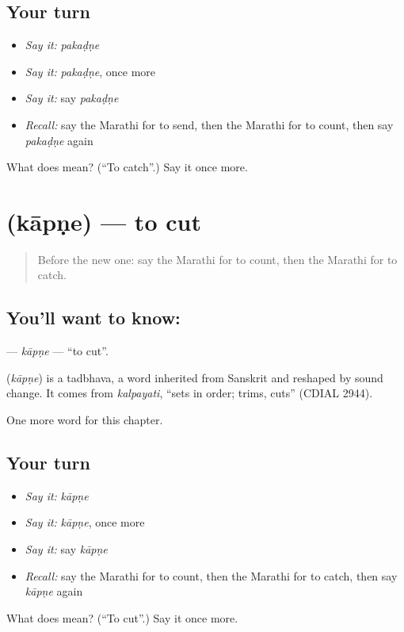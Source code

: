 \subsection*{Your turn}
\begin{itemize}
\raggedright
  \item \emph{Say it:} \emph{pakaḍṇe}
  \item \emph{Say it:} \emph{pakaḍṇe}, once more
  \item \emph{Say it:} say \emph{pakaḍṇe}
  \item \emph{Recall:} say the Marathi for to send, then the Marathi for to count, then say \emph{pakaḍṇe} again
\end{itemize}

\begin{tcolorbox}[breakable,colback=teal!4,colframe=teal!35!black,title={Before you move on}]
What does  mean? (\textquotedblleft{}To catch\textquotedblright{}.) Say it once more.
\end{tcolorbox}
\section[\texorpdfstring{\mr{कापणे} (kāpṇe)}{कापणे (kāpṇe)}]{ (kāpṇe) — to cut}

\label{lesson:MR-C80-kapne}



\begin{quote}
Before the new one: say the Marathi for to count, then the Marathi for to catch.
\end{quote}

\subsection*{You'll want to know: }
\textbf{} — \emph{kāpṇe} — \textquotedblleft{}to cut\textquotedblright{}.

\begin{cousinweb}
\textbf{} (\emph{kāpṇe}) is a tadbhava, a word inherited from Sanskrit and reshaped by sound change. It comes from \emph{kalpayati}, \textquotedblleft{}sets in order; trims, cuts\textquotedblright{} (CDIAL 2944).
\end{cousinweb}

\begin{grammarlens}[title={What you've built}]
One more word for this chapter.
\end{grammarlens}

\subsection*{Your turn}
\begin{itemize}
\raggedright
  \item \emph{Say it:} \emph{kāpṇe}
  \item \emph{Say it:} \emph{kāpṇe}, once more
  \item \emph{Say it:} say \emph{kāpṇe}
  \item \emph{Recall:} say the Marathi for to count, then the Marathi for to catch, then say \emph{kāpṇe} again
\end{itemize}

\begin{tcolorbox}[breakable,colback=teal!4,colframe=teal!35!black,title={Before you move on}]
What does  mean? (\textquotedblleft{}To cut\textquotedblright{}.) Say it once more.
\end{tcolorbox}

